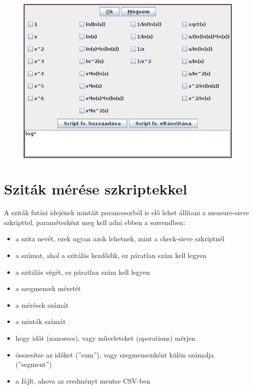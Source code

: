 \begin{figure}[h]
\centering
\includegraphics[scale=0.75]{functions}
\end{figure}

\section{Sziták mérése szkriptekkel}

A sziták futási idejének mintáit parancssorból is elő lehet állítani
a measure-sieve szkripttel, paraméterként meg kell adni ebben a sorrendben:

\begin{itemize}
\item a szita nevét, ezek ugyan azok lehetnek, mint a check-sieve szkriptnél
\item a számot, ahol a szitálás kezdődik, ez páratlan szám kell legyen
\item a szitálás végét, ez páratlan szám kell legyen
\item a szegmensek méretét
\item a mérések számát
\item a minták számát
\item hogy időt (nanosecs), vagy műveleteket (operations) mérjen
\item összesítse az időket (''sum''), vagy szegmensenként külön számolja (''segment'')
\item a fájlt, ahova az eredményt mentse CSV-ben
\end{itemize}

